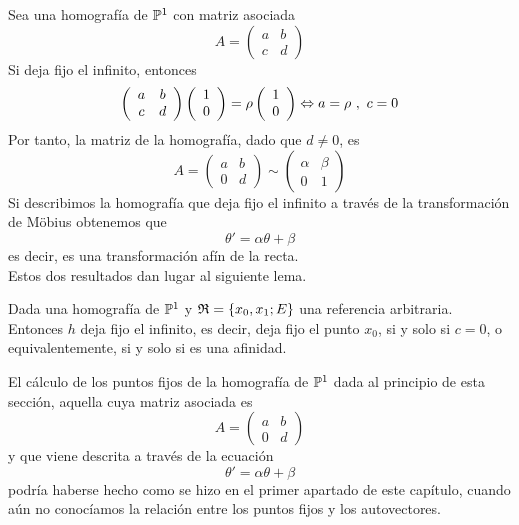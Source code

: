 Sea una homografía de $\mathbb{P}^1$ con matriz asociada
\begin{equation*}
	A=\left( \begin{array}{cc}
		a&b\\
		c&d
	\end{array}\right)
\end{equation*}
Si deja fijo el infinito, entonces
\begin{equation*}
	\left( \begin{array}{cc}
	a&b\\
	c&d
	\end{array}\right)
	\left( \begin{array}{c}
	1\\
	0
	\end{array}\right)=\rho\left( \begin{array}{c}
	1\\
	0
	\end{array}\right)\Leftrightarrow a=\rho \ , \ c=0
\end{equation*}
Por tanto, la matriz de la homografía, dado que $d\not=0$, es
\begin{equation*}
	A=\left( \begin{array}{cc}
		a&b\\
		0&d
	\end{array}\right)\sim 
	\left( \begin{array}{cc}
		\alpha&\beta\\
		0&1
	\end{array}\right)
\end{equation*}
Si describimos la homografía que deja fijo el infinito a través de la transformación de Möbius obtenemos que 
\begin{equation*}
	\theta'=\alpha\theta+\beta
\end{equation*}
es decir, es una transformación afín de la recta.\\

Estos dos resultados dan lugar al siguiente lema.
\begin{lem}\label{C6_lem_infinito_p1_sii_afinidad}
	Dada una homografía de $\mathbb{P}^1$ y $\mathfrak{R}=\{x_0,x_1;E\}$ una referencia arbitraria. Entonces $h$ deja fijo el infinito, es decir, deja fijo el punto $x_0$, si y solo si $c=0$, o equivalentemente, si y solo si es una afinidad.
\end{lem}

El cálculo de los puntos fijos de la homografía de $\mathbb{P}^1$ dada al principio de esta sección, aquella cuya matriz asociada es
\begin{equation*}
	A=\left( \begin{array}{cc}
		a&b\\
		0&d
	\end{array}\right)
\end{equation*}
y que viene descrita a través de la ecuación
\begin{equation*}
	\theta'=\alpha\theta+\beta
\end{equation*}
podría haberse hecho como se hizo en el primer apartado de este capítulo, cuando aún no conocíamos la relación entre los puntos fijos y los autovectores.

